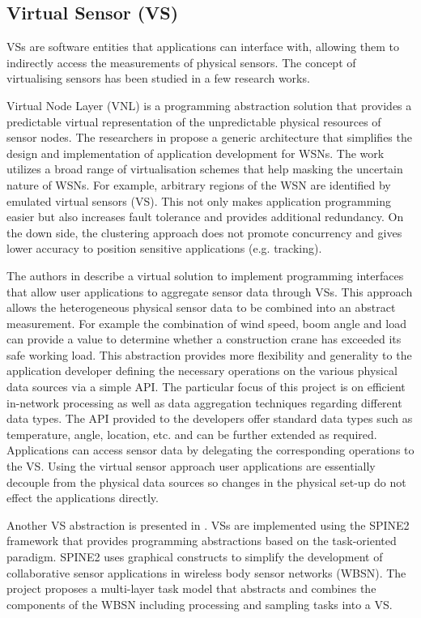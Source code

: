 \subsection{Virtual Sensor (VS)}
VSs are software entities that applications can interface with, allowing them to indirectly access the measurements of physical sensors.
The concept of virtualising sensors has been studied in a few research works.  

Virtual Node Layer (VNL) is a programming abstraction solution that provides a predictable virtual representation of the unpredictable physical resources of sensor nodes. The researchers in \cite{Brown:2007:VNL:1317103.1317105} propose a generic architecture that simplifies the design and implementation of application development for WSNs. The work utilizes a broad range of virtualisation schemes that help masking the uncertain nature of WSNs. For example, arbitrary regions of the WSN are identified by emulated virtual sensors (VS). This not only makes application programming easier but also increases fault tolerance and provides additional redundancy. On the down side, the clustering approach does not promote concurrency and gives lower accuracy to position sensitive applications (e.g. tracking).


The authors in \cite{1648519} describe a virtual solution to implement programming interfaces that allow user applications to aggregate sensor data through VSs. This approach allows the heterogeneous physical sensor data to be combined into an abstract measurement. For example the combination of wind speed, boom angle and load can provide a value to determine whether a construction crane has exceeded its safe working load. This abstraction provides more flexibility and generality to the application developer defining the necessary operations on the various physical data sources via a simple API. The particular focus of this project is on efficient in-network processing as well as data aggregation techniques regarding different data types. The API provided to the developers offer standard data types such as temperature, angle, location, etc. and can be further extended as required. Applications can access sensor data by delegating the corresponding operations to the VS. Using the virtual sensor approach user applications are essentially decouple  from the physical data sources so changes in the physical set-up do not effect the applications directly. 

Another VS abstraction is presented in \cite{5721776}. VSs are implemented using the SPINE2 framework \cite{5346155} that provides programming abstractions based on the task-oriented paradigm. SPINE2 uses graphical constructs to simplify the development of collaborative sensor applications in wireless body sensor networks (WBSN). The project proposes a multi-layer task model that abstracts and combines the components of the WBSN including processing and sampling tasks into a VS.
